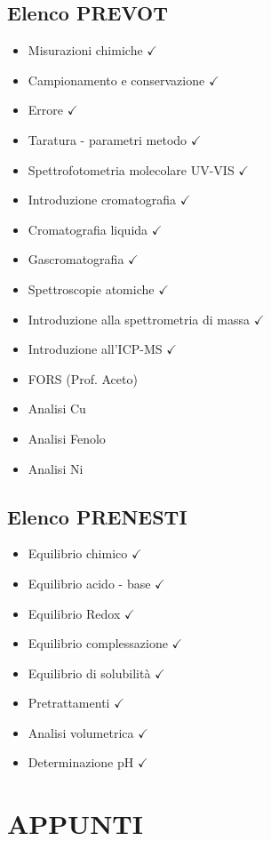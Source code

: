 \documentclass{article}
\begin{document}
\subsection{Elenco PREVOT}
\begin{itemize}
	\item Misurazioni chimiche $\checkmark$
	\item Campionamento e conservazione $\checkmark$
	\item Errore $\checkmark$
	\item Taratura - parametri metodo $\checkmark$
	\item Spettrofotometria molecolare UV-VIS $\checkmark$
	\item Introduzione cromatografia $\checkmark$
	\item Cromatografia liquida $\checkmark$
	\item Gascromatografia $\checkmark$
	\item Spettroscopie atomiche $\checkmark$
	\item Introduzione alla spettrometria di massa $\checkmark$
	\item Introduzione all'ICP-MS $\checkmark$
	\item FORS (Prof. Aceto)
	\item Analisi Cu
	\item Analisi Fenolo
	\item Analisi Ni
\end{itemize}
\subsection{Elenco PRENESTI}
\begin{itemize}
	\item Equilibrio chimico $\checkmark$
	\item Equilibrio acido - base $\checkmark$
	\item Equilibrio Redox $\checkmark$
	\item Equilibrio complessazione $\checkmark$
	\item Equilibrio di solubilità $\checkmark$
	\item Pretrattamenti $\checkmark$
	\item Analisi volumetrica $\checkmark$
	\item Determinazione pH $\checkmark$
\end{itemize}

\newpage

\section{APPUNTI}
\end{document}
